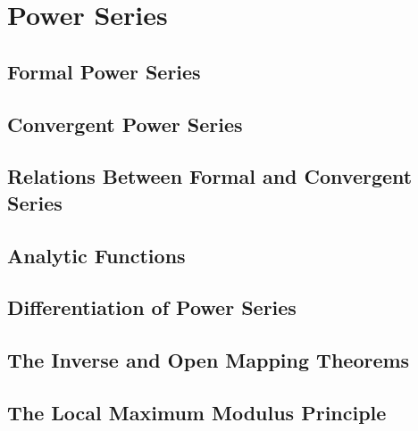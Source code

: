 \chapter{Power Series}
\section{Formal Power Series}
\section{Convergent Power Series}
\section{Relations Between Formal and Convergent Series}
\section{Analytic Functions}
\section{Differentiation of Power Series}
\section{The Inverse and Open Mapping Theorems}
\section{The Local Maximum Modulus Principle}